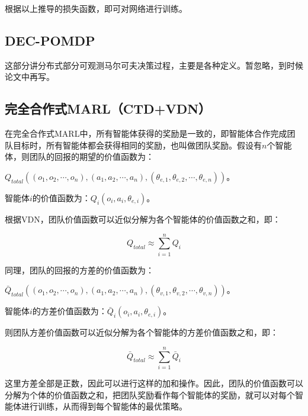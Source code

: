 \documentclass[UTF8]{ctexart}
\begin{document}
根据以上推导的损失函数，即可对网络进行训练。

\subsection{DEC-POMDP}
这部分讲分布式部分可观测马尔可夫决策过程，主要是各种定义。暂忽略，到时候论文中再写。

\subsection{完全合作式MARL（CTD+VDN）}

在完全合作式MARL中，所有智能体获得的奖励是一致的，即智能体合作完成团队目标时，所有智能体都会获得相同的奖励，也叫做团队奖励。假设有$n$个智能体，则团队的回报的期望的价值函数为：

$Q_{total}((o_1, o_2, \cdots, o_n), (a_1, a_2, \cdots, a_n), (\theta_{e, 1}, \theta_{e, 2}, \cdots, \theta_{e, n}))$。

智能体$i$的价值函数为：$Q_i(o_i, a_i, \theta_{e, i})$。

根据VDN，团队价值函数可以近似分解为各个智能体的价值函数之和，即：

$$
Q_{total} \approx \sum_{i=1}^{n}Q_i
$$

同理，团队的回报的方差的价值函数为：

$\bar{Q}_{total}((o_1, o_2, \cdots, o_n), (a_1, a_2, \cdots, a_n), (\theta_{v, 1}, \theta_{v, 2}, \cdots, \theta_{v, n}))$。

智能体$i$的方差价值函数为：$\bar{Q}_i(o_i, a_i, \theta_{e, i})$。

则团队方差价值函数可以近似分解为各个智能体的方差价值函数之和，即：

$$
\bar{Q}_{total} \approx \sum_{i=1}^{n}\bar{Q}_i
$$

这里方差全部是正数，因此可以进行这样的加和操作。因此，团队的价值函数可以分解为个体的价值函数之和，把团队奖励看作每个智能体的奖励，就可以对每个智能体进行训练，从而得到每个智能体的最优策略。

	
\end{document}
